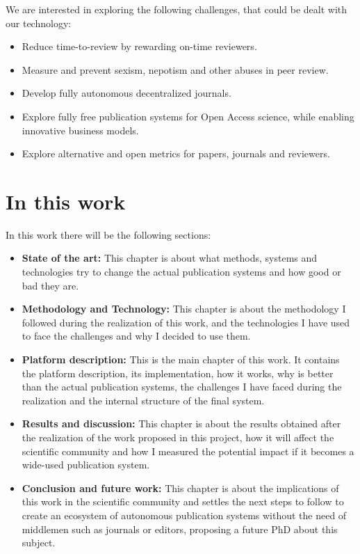  We are interested in exploring the following challenges, that could be dealt with our technology:
\begin{itemize}
  \item Reduce time-to-review by rewarding on-time reviewers.
  \item Measure and prevent sexism, nepotism and other abuses in peer review.
  \item Develop fully autonomous decentralized journals.
  \item Explore fully free publication systems for Open Access science, while enabling innovative business models.
  \item Explore alternative and open metrics for papers, journals and reviewers.
  \end{itemize}

  \section{In this work}
  In this work there will be the  following sections:
  \begin{itemize}
    \item \textbf{State of the art:} This chapter is about what
      methods, systems and technologies try to change the actual publication
      systems and how good or bad they are.
    \item \textbf{Methodology and Technology:} This chapter is about the
      methodology I followed during the realization of this work, and the
      technologies I have used to face the challenges and why I decided to use
      them.
    \item \textbf{Platform description:} This is the main chapter of this work.
      It contains the platform description, its implementation, how it works,
      why is better than the actual publication systems, the challenges I have
      faced during the realization and the internal structure of the final
      system.
    \item \textbf{Results and discussion:} This chapter is about the results
      obtained after the realization of the work proposed in this project, how
      it will affect the scientific community and how I measured the potential
      impact if it becomes a wide-used publication system.
    \item \textbf{Conclusion and future work:} This chapter is about the
      implications of this work in the scientific community and settles the next
      steps to follow to create an ecosystem of autonomous publication systems
      without the need of middlemen such as journals or editors, proposing a
      future PhD about this subject.
  \end{itemize}



